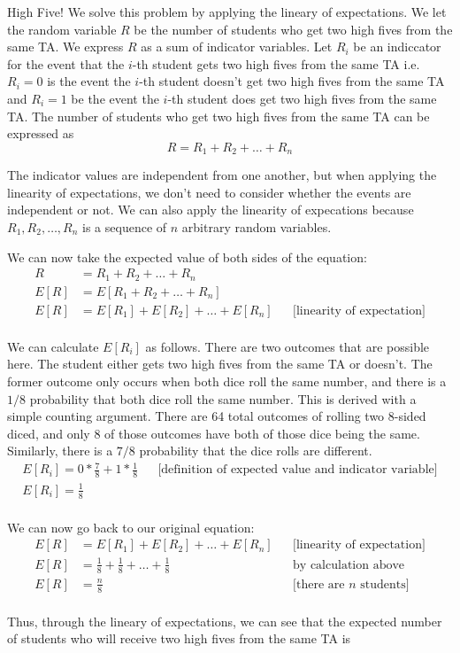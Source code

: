 \documentclass[11pt, nopagenumbers]{adamblan-hw}
\begin{document}
\begin{question}{High Five!}
We solve this problem by applying the lineary of expectations. We let the random variable $R$ be the number of students
who get two high fives from the same TA. We express $R$ as a sum of indicator variables. Let
$R_i$ be an indiccator for the event that the $i$-th student gets two high fives from the same TA i.e.
$R_i = 0$ is the event the $i$-th student doesn't get two high fives from the same TA and $R_i = 1$ be the
event the $i$-th student does get two high fives from the same TA. The number of students who get two high fives from 
the same TA can be expressed as $$R = R_1 + R_2 + \dots + R_n$$

The indicator values are independent from one another, but when applying the linearity of expectations, we don't need to consider whether the events are independent or not.
We can also apply the linearity of expecations because $R_1, R_2, \dots, R_n$ is a sequence of $n$ arbitrary random variables.

We can now take the expected value of both sides of the equation:
\begin{align*}
R &= R_1 + R_2 + \dots + R_n \\
E[R] &= E[R_1 + R_2 + \dots + R_n] \\
E[R] &= E[R_1] + E[R_2] + \dots + E[R_n] && \text{[linearity of expectation]} \\
\end{align*}

We can calculate $E[R_i]$ as follows. There are two outcomes that are possible here. The student either 
gets two high fives from the same TA or doesn't. The former outcome only occurs when both dice roll the same number,
and there is a $1/8$ probability that both dice roll the same number. This is derived with a simple counting argument.
There are 64 total outcomes of rolling two 8-sided diced, and only 8 of those outcomes have both of those dice being the same.
Similarly, there is a $7/8$ probability that the dice rolls are different.
\begin{align*}
E[R_i] = 0 * \frac{7}{8} + 1 * \frac{1}{8} && \text{[definition of expected value and indicator variable]} \\
E[R_i] = \frac{1}{8} \\
\end{align*}

We can now go back to our original equation:
\begin{align*}
E[R] &= E[R_1] + E[R_2] + \dots + E[R_n] && \text{[linearity of expectation]} \\
E[R] &= \frac{1}{8} + \frac{1}{8} + \dots + \frac{1}{8} && \text{by calculation above}\\
E[R] &= \frac{n}{8} && \text{[there are $n$ students]}\\
\end{align*}

Thus, through the lineary of expectations, we can see that the expected number of students who will receive two high fives from the same TA is 
\end{question}
\end{document}
